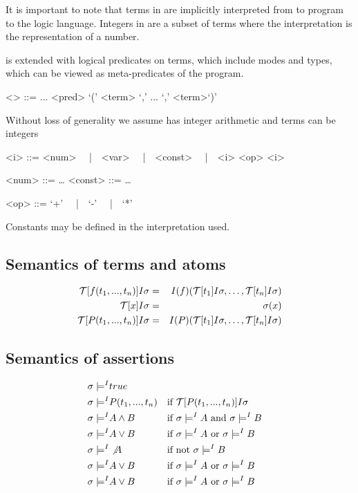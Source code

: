 It is important to note that terms in \Cond{} are implicitly interpreted
from to program to the logic language.
%
Integers in \Cond{} are a subset of terms where the interpretation is
the representation of a number.


\Cond{} is extended with logical predicates on terms, which include modes
and types, which can be viewed as meta-predicates of the program.

\begin{grammar}
<\Cond> ::= ...
\alt  <pred> `(' <term> `,' ... `,' <term>`)'
\end{grammar}

Without loss of generality we assume \Cond{} has integer arithmetic and
terms can be integers

\begin{grammar}
<i> ::= <num>
\ \ |\ \ <var>
\ \ |\ \ <const>
\ \ |\ \ <i> <op> <i>

<num> ::= \dots
<const> ::= \dots

<op> ::= `+'
\ \ |\ \ `-'
\ \ |\ \ `*'
\end{grammar}

Constants may be defined in the interpretation used.


\subsection{Semantics of terms and atoms}

\begin{eqnarray*}
 \mathcal{T} [ f(t_1,...,t_n) ] I \sigma& =& 
I(f)( \mathcal{T} [ t_1 ] I \sigma, \ldots,  \mathcal{T} [ t_n ] I \sigma)
\\
 \mathcal{T} [ x ] I \sigma& =& \sigma(x)
\\
 \mathcal{T} [ P(t_1,...,t_n) ] I \sigma& =& 
I(P)( \mathcal{T} [ t_1 ] I \sigma, \ldots,  \mathcal{T} [ t_n ] I \sigma)
\end{eqnarray*}


\subsection{Semantics of assertions}

\begin{align*}
 \sigma \models^{I} &true \\
 \sigma \models^{I} &P(t_1,...,t_n)
 && \text{if }  \mathcal{T} [ P(t_1,...,t_n) ] I \sigma\\
 \sigma \models^{I} &A \wedge B
 &&\text{if }  \sigma \models^{I} A \text{ and }  \sigma \models^{I} B\\
 \sigma \models^{I} &A \vee B
 &&\text{if }  \sigma \models^{I} A \text{ or }  \sigma \models^{I} B\\
 \sigma \models^{I} &\not A 
 &&\text{if } \text{not }  \sigma \models^{I} B\\
 \sigma \models^{I} &A \vee B
 &&\text{if }  \sigma \models^{I} A \text{ or }  \sigma \models^{I} B\\
 \sigma \models^{I} &A \vee B
 &&\text{if }  \sigma \models^{I} A \text{ or }  \sigma \models^{I} B\\
\end{align*}

